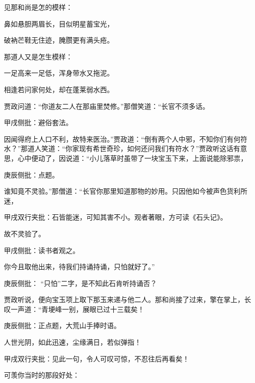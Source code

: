 \begin{parag}
    见那和尚是怎的模样：
\end{parag}


\begin{poem}
    \begin{pl}鼻如悬胆两眉长，目似明星蓄宝光，\end{pl}
    \begin{pl}破衲芒鞋无住迹，腌臜更有满头疮。\end{pl}
\end{poem}


\begin{parag}
    那道人又是怎生模样：
\end{parag}
\begin{poem}

    \begin{pl}一足高来一足低，浑身带水又拖泥。\end{pl}
    \begin{pl}相逢若问家何处，却在蓬莱弱水西。\end{pl}
\end{poem}


\begin{parag}
    贾政问道：“你道友二人在那庙里焚修。”那僧笑道：“长官不须多话。\begin{note}甲戌侧批：避俗套法。\end{note}因闻得府上人口不利，故特来医治。”贾政道：“倒有两个人中邪，不知你们有何符水？”那道人笑道：“你家现有希世奇珍，如何还问我们有符水？”贾政听这话有意思，心中便动了，因说道：“小儿落草时虽带了一块宝玉下来，上面说能除邪祟，\begin{note}庚辰侧批：点题。\end{note}谁知竟不灵验。”那僧道：“长官你那里知道那物的妙用。只因他如今被声色货利所迷，\begin{note}甲戌双行夹批：石皆能迷，可知其害不小。观者著眼，方可读《石头记》。\end{note}故不灵验了。\begin{note}甲戌侧批：读书者观之。\end{note}你今且取他出来，待我们持诵持诵，只怕就好了。”\begin{note}庚辰侧批： “只怕”二字，是不知此石肯听持诵否？\end{note}
\end{parag}


\begin{parag}
    贾政听说，便向宝玉项上取下那玉来递与他二人。那和尚接了过来，擎在掌上，长叹一声道：“青埂峰一别，展眼已过十三载矣！\begin{note}庚辰侧批：正点题，大荒山手捧时语。\end{note}人世光阴，如此迅速，尘缘满日，若似弹指！\begin{note}甲戌双行夹批：见此一句，令人可叹可惊，不忍往后再看矣！\end{note}可羡你当时的那段好处：
\end{parag}


